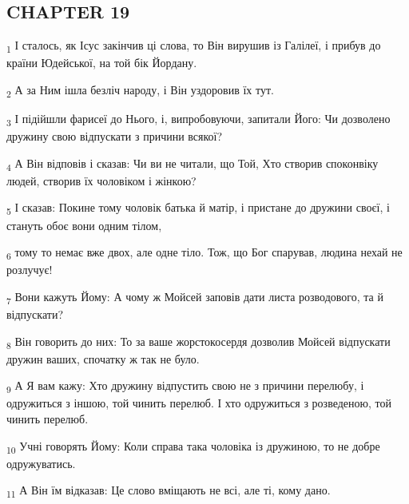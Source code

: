 \subsection{CHAPTER 19}
\begin{tcolorbox}
\textsubscript{1} І сталось, як Ісус закінчив ці слова, то Він вирушив із Галілеї, і прибув до країни Юдейської, на той бік Йордану.
\end{tcolorbox}
\begin{tcolorbox}
\textsubscript{2} А за Ним ішла безліч народу, і Він уздоровив їх тут.
\end{tcolorbox}
\begin{tcolorbox}
\textsubscript{3} І підійшли фарисеї до Нього, і, випробовуючи, запитали Його: Чи дозволено дружину свою відпускати з причини всякої?
\end{tcolorbox}
\begin{tcolorbox}
\textsubscript{4} А Він відповів і сказав: Чи ви не читали, що Той, Хто створив споконвіку людей, створив їх чоловіком і жінкою?
\end{tcolorbox}
\begin{tcolorbox}
\textsubscript{5} І сказав: Покине тому чоловік батька й матір, і пристане до дружини своєї, і стануть обоє вони одним тілом,
\end{tcolorbox}
\begin{tcolorbox}
\textsubscript{6} тому то немає вже двох, але одне тіло. Тож, що Бог спарував, людина нехай не розлучує!
\end{tcolorbox}
\begin{tcolorbox}
\textsubscript{7} Вони кажуть Йому: А чому ж Мойсей заповів дати листа розводового, та й відпускати?
\end{tcolorbox}
\begin{tcolorbox}
\textsubscript{8} Він говорить до них: То за ваше жорстокосердя дозволив Мойсей відпускати дружин ваших, спочатку ж так не було.
\end{tcolorbox}
\begin{tcolorbox}
\textsubscript{9} А Я вам кажу: Хто дружину відпустить свою не з причини перелюбу, і одружиться з іншою, той чинить перелюб. І хто одружиться з розведеною, той чинить перелюб.
\end{tcolorbox}
\begin{tcolorbox}
\textsubscript{10} Учні говорять Йому: Коли справа така чоловіка із дружиною, то не добре одружуватись.
\end{tcolorbox}
\begin{tcolorbox}
\textsubscript{11} А Він їм відказав: Це слово вміщають не всі, але ті, кому дано.
\end{tcolorbox}
